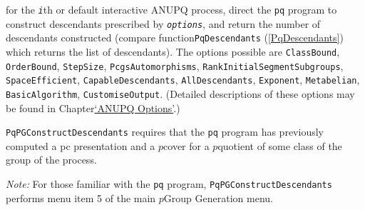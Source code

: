 \documentclass[a4paper,11pt]{report}
\begin{document}
{{{ for the \mbox{\texttt{\mdseries\slshape i}}th or default interactive \textsf{ANUPQ} process, direct the \texttt{pq} program to construct descendants prescribed by \mbox{\texttt{\mdseries\slshape options}}, and return the number of descendants constructed (compare
function{\nobreakspace}\texttt{PqDescendants} (\ref{PqDescendants}) which returns the list of descendants). The options possible are \texttt{ClassBound}, \texttt{OrderBound}, \texttt{StepSize}, \texttt{PcgsAutomorphisms}, \texttt{RankInitialSegmentSubgroups}, \texttt{SpaceEfficient}, \texttt{CapableDescendants}, \texttt{AllDescendants}, \texttt{Exponent}, \texttt{Metabelian}, \texttt{BasicAlgorithm}, \texttt{CustomiseOutput}. (Detailed descriptions of these options may be found in
Chapter{\nobreakspace}\hyperref[ANUPQ Options]{`ANUPQ Options'}.) 

 \texttt{PqPGConstructDescendants} requires that the \texttt{pq} program has previously computed a pc presentation and a $p$\texttt{}cover for a $p$\texttt{}quotient of some class of the group of the process. 

 \emph{Note:} For those familiar with the \texttt{pq} program, \texttt{PqPGConstructDescendants} performs menu item 5 of the main $p$\texttt{}Group Generation menu. }

 

}}
\end{document}
